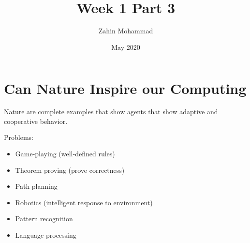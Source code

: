 \documentclass{article}
\title{Week 1 Part 3}
\author{Zahin Mohammad}
\date{May 2020}
\begin{document}
\maketitle
\section{Can Nature Inspire our Computing}
Nature are complete examples that show agents that show adaptive and cooperative behavior.
\setlength{\parskip}{6pt}

Problems:
\begin{itemize}
    \item Game-playing (well-defined rules)
    \item Theorem proving (prove correctness)
    \item Path planning
    \item Robotics (intelligent response to environment)
    \item Pattern recognition
    \item Language processing
\end{itemize}
\printbibliography[title={Referências}]
\end{document}
